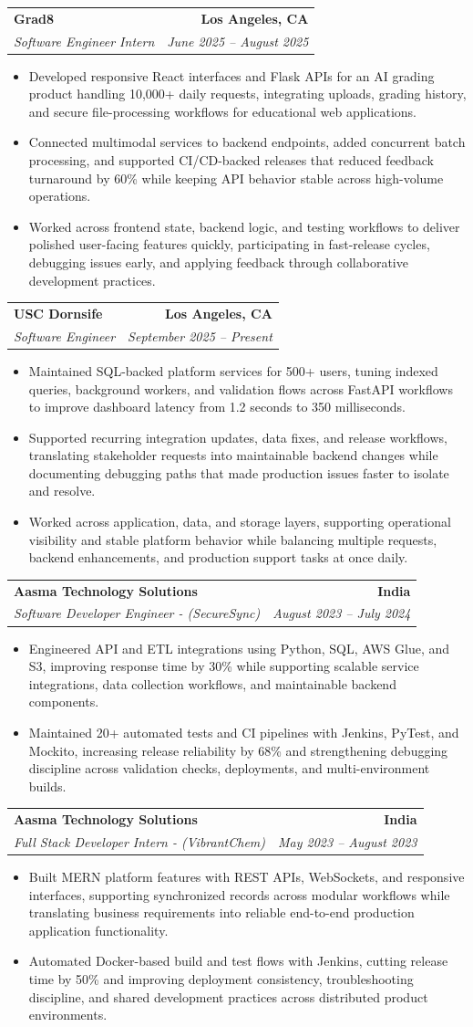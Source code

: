 \documentclass[letterpaper,10pt]{article}
\makeatletter
\newcommand{\resumeItem}[1]{\item\small{{#1 \vspace{-2pt}}}}
\newcommand{\resumeSubheading}[4]{\vspace{-1pt}\item\begin{tabular*}{1.0\textwidth}[t]{l@{\extracolsep{\fill}}r}\textbf{#1} & \textbf{\small #2} \\\textit{\small#3} & \textit{\small #4} \\\end{tabular*}\vspace{-2pt}}
\newcommand{\resumeItemListStart}{\begin{itemize}[leftmargin=0.15in,label=\textbullet,itemsep=2pt,topsep=0pt,parsep=0pt,partopsep=0pt]}
\newcommand{\resumeItemListEnd}{\end{itemize}\vspace{-4pt}}
\makeatother
\begin{document}
\resumeSubheading{Grad8}{Los Angeles, CA}{Software Engineer Intern}{June 2025 -- August 2025}
\resumeItemListStart
\resumeItem{Developed responsive React interfaces and Flask APIs for an AI grading product handling 10,000+ daily requests, integrating uploads, grading history, and secure file-processing workflows for educational web applications.}
\resumeItem{Connected multimodal services to backend endpoints, added concurrent batch processing, and supported CI/CD-backed releases that reduced feedback turnaround by 60\% while keeping API behavior stable across high-volume operations.}
\resumeItem{Worked across frontend state, backend logic, and testing workflows to deliver polished user-facing features quickly, participating in fast-release cycles, debugging issues early, and applying feedback through collaborative development practices.}
\resumeItemListEnd

\resumeSubheading{USC Dornsife}{Los Angeles, CA}{Software Engineer}{September 2025 -- Present}
\resumeItemListStart
\resumeItem{Maintained SQL-backed platform services for 500+ users, tuning indexed queries, background workers, and validation flows across FastAPI workflows to improve dashboard latency from 1.2 seconds to 350 milliseconds.}
\resumeItem{Supported recurring integration updates, data fixes, and release workflows, translating stakeholder requests into maintainable backend changes while documenting debugging paths that made production issues faster to isolate and resolve.}
\resumeItem{Worked across application, data, and storage layers, supporting operational visibility and stable platform behavior while balancing multiple requests, backend enhancements, and production support tasks at once daily.}
\resumeItemListEnd

\resumeSubheading{Aasma Technology Solutions}{India}{Software Developer Engineer - (SecureSync)}{August 2023 -- July 2024}
\resumeItemListStart
\resumeItem{Engineered API and ETL integrations using Python, SQL, AWS Glue, and S3, improving response time by 30\% while supporting scalable service integrations, data collection workflows, and maintainable backend components.}
\resumeItem{Maintained 20+ automated tests and CI pipelines with Jenkins, PyTest, and Mockito, increasing release reliability by 68\% and strengthening debugging discipline across validation checks, deployments, and multi-environment builds.}
\resumeItemListEnd

\resumeSubheading{Aasma Technology Solutions}{India}{Full Stack Developer Intern - (VibrantChem)}{May 2023 -- August 2023}
\resumeItemListStart
\resumeItem{Built MERN platform features with REST APIs, WebSockets, and responsive interfaces, supporting synchronized records across modular workflows while translating business requirements into reliable end-to-end production application functionality.}
\resumeItem{Automated Docker-based build and test flows with Jenkins, cutting release time by 50\% and improving deployment consistency, troubleshooting discipline, and shared development practices across distributed product environments.}
\resumeItemListEnd
\end{document}
